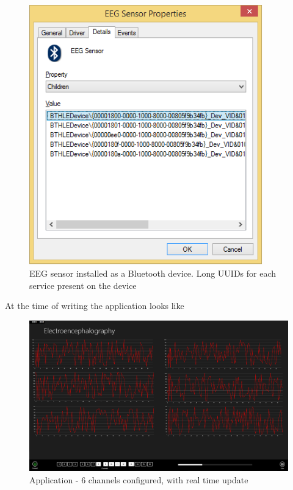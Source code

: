 \documentclass[]{article}
\begin{document}
\begin{figure}[htb]
	\begin{center}
		\includegraphics[width = 0.9\textwidth]{dvcmgr}
	\end{center}
	\caption{\ac{EEG} sensor installed as a Bluetooth device. Long UUIDs for each service present on the device}
	\label{fig:dvcmgr}
\end{figure}


At the time of writing the application looks like


\begin{figure}[htb]
	\begin{center}
		\includegraphics[width = 1.4\textwidth,angle = 90]{exampleapp}
	\end{center}
	\caption{Application - 6 channels configured, with real time update}
	\label{fig:exampleapp}
\end{figure}
\end{document}
